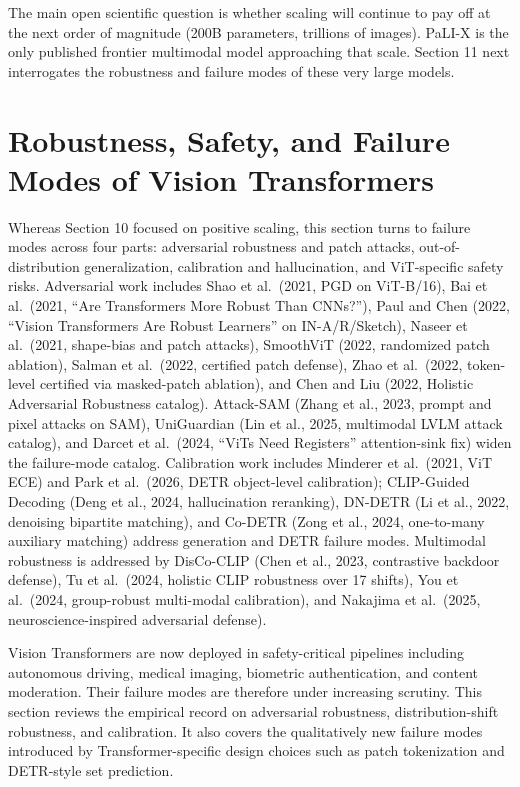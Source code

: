 The main open scientific question is whether scaling will continue to pay off at the next order of magnitude (200B parameters, trillions of images). PaLI-X is the only published frontier multimodal model approaching that scale. Section 11 next interrogates the robustness and failure modes of these very large models.

\section{Robustness, Safety, and Failure Modes of Vision Transformers}\label{robustness-safety-and-failure-modes-of-vision-transformers}

Whereas Section 10 focused on positive scaling, this section turns to failure modes across four parts: adversarial robustness and patch attacks, out-of-distribution generalization, calibration and hallucination, and ViT-specific safety risks. Adversarial work includes Shao et al.~(2021, PGD on ViT-B/16), Bai et al.~(2021, ``Are Transformers More Robust Than CNNs?''), Paul and Chen (2022, ``Vision Transformers Are Robust Learners'' on IN-A/R/Sketch), Naseer et al.~(2021, shape-bias and patch attacks), SmoothViT (2022, randomized patch ablation), Salman et al.~(2022, certified patch defense), Zhao et al.~(2022, token-level certified via masked-patch ablation), and Chen and Liu (2022, Holistic Adversarial Robustness catalog). Attack-SAM (Zhang et al., 2023, prompt and pixel attacks on SAM), UniGuardian (Lin et al., 2025, multimodal LVLM attack catalog), and Darcet et al.~(2024, ``ViTs Need Registers'' attention-sink fix) widen the failure-mode catalog. Calibration work includes Minderer et al.~(2021, ViT ECE) and Park et al.~(2026, DETR object-level calibration); CLIP-Guided Decoding (Deng et al., 2024, hallucination reranking), DN-DETR (Li et al., 2022, denoising bipartite matching), and Co-DETR (Zong et al., 2024, one-to-many auxiliary matching) address generation and DETR failure modes. Multimodal robustness is addressed by DisCo-CLIP (Chen et al., 2023, contrastive backdoor defense), Tu et al.~(2024, holistic CLIP robustness over 17 shifts), You et al.~(2024, group-robust multi-modal calibration), and Nakajima et al.~(2025, neuroscience-inspired adversarial defense).

Vision Transformers are now deployed in safety-critical pipelines including autonomous driving, medical imaging, biometric authentication, and content moderation. Their failure modes are therefore under increasing scrutiny. This section reviews the empirical record on adversarial robustness, distribution-shift robustness, and calibration. It also covers the qualitatively new failure modes introduced by Transformer-specific design choices such as patch tokenization and DETR-style set prediction.

